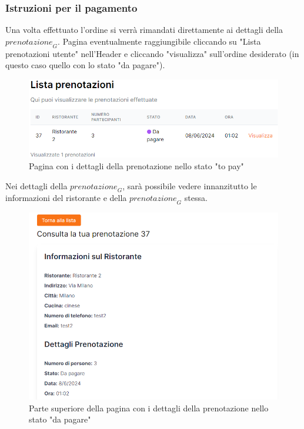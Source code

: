 \subsubsection{Istruzioni per il pagamento}
Una volta effettuato l'ordine si verrà rimandati direttamente ai dettagli della $\textit{prenotazione}_G$. Pagina eventualmente raggiungibile cliccando su "Lista prenotazioni utente" nell'Header e cliccando "visualizza" sull'ordine desiderato (in questo caso quello con lo stato "da pagare").
\begin{figure}[H]
    \centering
    \includegraphics[width=0.6\linewidth]{img/stato_to_pay.png}
    \caption{Pagina con i dettagli della prenotazione nello stato "to pay"}
    \label{fig:stato_to_pay}
\end{figure}
Nei dettagli della $\textit{prenotazione}_G$, sarà possibile vedere innanzitutto le informazioni del ristorante e della $\textit{prenotazione}_G$ stessa.
\begin{figure}[H]
    \centering
    \includegraphics[width=0.6\linewidth]{img/dettagli_prenotazione_to_pay_superiore.png}
    \caption{Parte superiore della pagina con i dettagli della prenotazione nello stato "da pagare"}
    \label{fig:dettagli_prenotazione_to_pay_superiore}
\end{figure}


